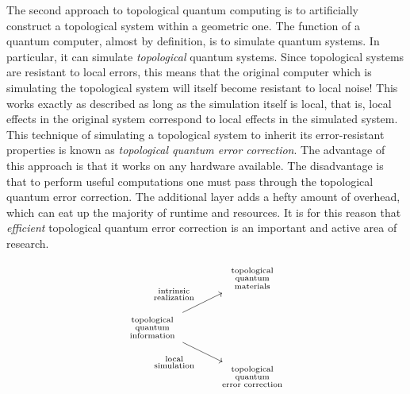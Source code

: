 \documentclass{article}
\theoremstyle{definition}
\numberwithin{figure}{section}
\begin{document}
The second approach to topological quantum computing is to artificially construct a topological system within a geometric one. The function of a quantum computer, almost by definition, is to simulate quantum systems. In particular, it can simulate \textit{topological} quantum systems. Since topological systems are resistant to local errors, this means that the original computer which is simulating the topological system will itself become resistant to local noise! This works exactly as described as long as the simulation itself is local, that is, local effects in the original system correspond to local effects in the simulated system. This technique of simulating a topological system to inherit its error-resistant properties is known as \textit{topological quantum error correction}. The advantage of this approach is that it works on any hardware available. The disadvantage is that to perform useful computations one must pass through the topological quantum error correction. The additional layer adds a hefty amount of overhead, which can eat up the majority of runtime and resources. It is for this reason that \textit{efficient} topological quantum error correction is an important and active area of research.

\[\begin{tikzcd}
	& \begin{array}{c} \substack{\text{topological}\\ \text{quantum}\\\text{materials}} \end{array} \\
	\begin{array}{c} \substack{\text{topological} \\ \text{quantum} \\ \text{information}} \end{array} \\
	& \begin{array}{c} \substack{\text{topological}\\\text{quantum}\\ \text{error correction}} \end{array}
	\arrow["\begin{array}{c} \substack{\text{intrinsic}\\\text{realization}} \end{array}", from=2-1, to=1-2]
	\arrow["\begin{array}{c} \substack{\text{local}\\\text{simulation}} \end{array}"', from=2-1, to=3-2]
\end{tikzcd}\]
\end{document}
